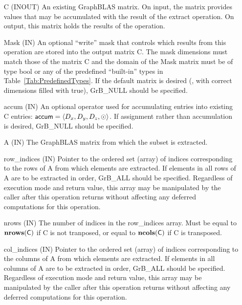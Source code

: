 \begin{itemize}[leftmargin=1in]
    \item[{\sf C}]     ({\sf INOUT}) An existing GraphBLAS matrix.  On input,
    the matrix provides values that may be accumulated with the result of the
    extract operation.  On output, this matrix holds the results of the
    operation.

    \item[{\sf Mask}] ({\sf IN}) An optional ``write'' mask that controls which
    results from this operation are stored into the output matrix {\sf C}. The 
    mask dimensions must match those of the matrix {\sf C} and the domain of the 
    {\sf Mask} matrix must be of type {\sf bool} or any of the predefined 
    ``built-in'' types in Table~\ref{Tab:PredefinedTypes}.  If the default
    matrix is desired (\ie, with correct dimensions filled with {\sf true}), 
    {\sf GrB\_NULL} should be specified.

    \item[{\sf accum}] ({\sf IN})  An optional operator used for accumulating
    entries into existing {\sf C} entries: ${\sf accum} = \langle D_x,
    D_y, D_z,\odot \rangle$. If assignment rather than accumulation is
    desired, {\sf GrB\_NULL} should be specified.

    \item[{\sf A}]     ({\sf IN})  The GraphBLAS matrix from which the subset
    is extracted.

    \item[{\sf row\_indices}] ({\sf IN}) Pointer to the ordered set (array) of 
    indices corresponding to the rows of {\sf A} from which elements are 
    extracted.  If elements in all rows of {\sf A} are to be extracted in order, 
    {\sf GrB\_ALL} should be specified.  Regardless of execution mode and return
    value, this array may be manipulated by the caller after this operation 
    returns without affecting any deferred computations for this operation.
    
    \item[{\sf nrows}] ({\sf IN}) The number of indices in the {\sf row\_indices}
    array.  Must be equal to $\bold{nrows}({\sf C})$ if {\sf C} is not tranposed,
	or equal to $\bold{ncols}({\sf C})$ if {\sf C} is transposed.
    
    \item[{\sf col\_indices}] ({\sf IN}) Pointer to the ordered set (array) of 
    indices corresponding to the columns of {\sf A} from which elements are 
    extracted.  If elements in all columns of {\sf A} are to be extracted in order, 
    {\sf GrB\_ALL} should be specified.  Regardless of execution mode and return
    value, this array may be manipulated by the caller after this operation 
    returns without affecting any deferred computations for this operation.
    

\end{itemize}
